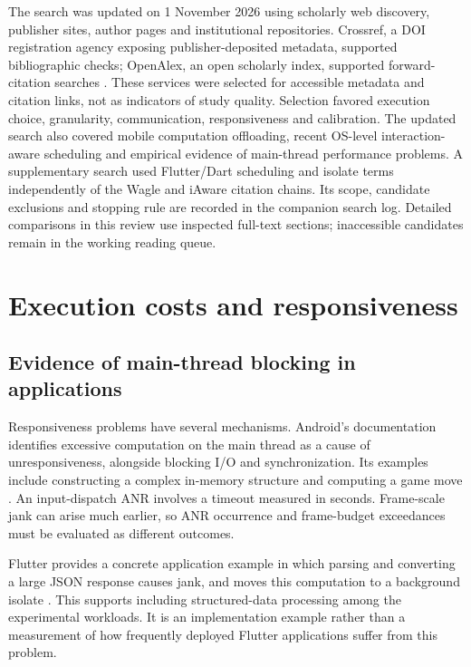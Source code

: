 \documentclass[14pt,a4paper,oneside]{extreport}
\begin{document}
The search was updated on 1 November 2026 using scholarly web discovery, publisher sites,
author pages and institutional repositories. Crossref, a DOI registration agency exposing
publisher-deposited metadata, supported bibliographic checks; OpenAlex, an open scholarly
index, supported forward-citation searches \citep{crossref-api, openalex-docs}. These services
were selected for accessible metadata and citation links, not as indicators of study quality.
Selection favored execution choice, granularity, communication, responsiveness and
calibration. The updated search also covered mobile computation offloading, recent OS-level
interaction-aware scheduling and empirical evidence of main-thread performance problems.
A supplementary search used Flutter/Dart scheduling and isolate terms
independently of the Wagle and iAware citation chains. Its scope, candidate exclusions and
stopping rule are recorded in the companion search log. Detailed comparisons in this review
use inspected full-text sections; inaccessible candidates remain in the working reading queue.

\section{Execution costs and responsiveness}
\label{execution-costs-and-responsiveness}

\subsection{Evidence of main-thread blocking in applications}
\label{evidence-of-main-thread-blocking}

Responsiveness problems have several mechanisms. Android's documentation identifies
excessive computation on the main thread as a cause of unresponsiveness, alongside
blocking I/O and synchronization. Its examples include constructing a complex in-memory
structure and computing a game move \citep{android-responsive}. An input-dispatch ANR
involves a timeout measured in seconds. Frame-scale jank can arise much earlier, so ANR
occurrence and frame-budget exceedances must be evaluated as different outcomes.

Flutter provides a concrete application example in which parsing and converting a large
JSON response causes jank, and moves this computation to a background isolate
\citep{flutter-json}. This supports including structured-data processing among the
experimental workloads. It is an implementation example rather than a measurement of how
frequently deployed Flutter applications suffer from this problem.
\end{document}
